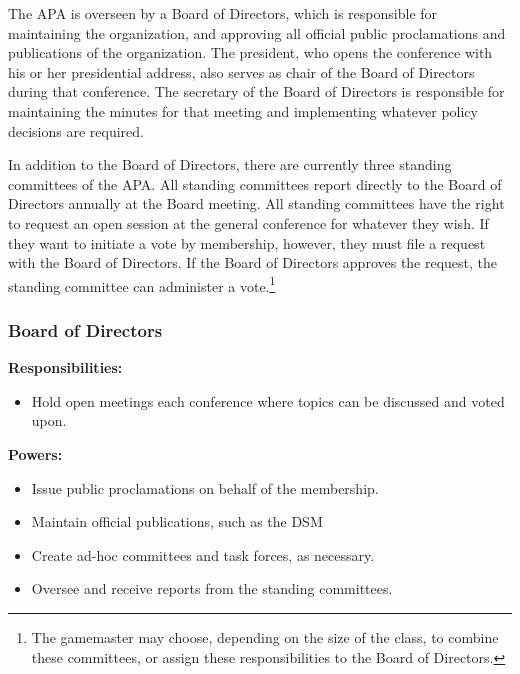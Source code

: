 \begin{refsection}
The APA is overseen by a Board of Directors, which is responsible for maintaining the organization, and approving all official public proclamations and publications of the organization. The president, who opens the conference with his or her presidential address, also serves as chair of the Board of Directors during that conference. The secretary of the Board of Directors is responsible for maintaining the minutes for that meeting and implementing whatever policy decisions are required.

In addition to the Board of Directors, there are currently three standing committees of the APA. All standing committees report directly to the Board of Directors annually at the Board meeting. All standing committees have the right to request an open session at the general conference for whatever they wish. If they want to initiate a vote by membership, however, they must file a request with the Board of Directors. If the Board of Directors approves the request, the standing committee can administer a vote.\footnote{The gamemaster may choose, depending on the size of the class, to combine these committees, or assign these responsibilities to the Board of Directors.}

\newpage

\subsubsection{Board of Directors}
\label{boardofdirectors}

\textbf{Responsibilities:}

\begin{itemize}
\item Hold open meetings each conference where topics can be discussed and voted upon.

\end{itemize}

\textbf{Powers:}

\begin{itemize}
\item Issue public proclamations on behalf of the membership.

\item Maintain official publications, such as the DSM

\item Create ad-hoc committees and task forces, as necessary.

\item Oversee and receive reports from the standing committees.


\end{itemize}
\end{refsection}
